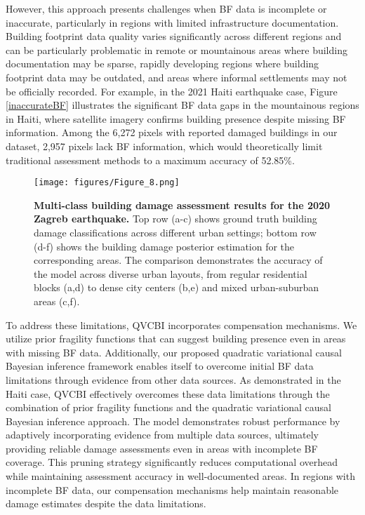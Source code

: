 \documentclass[review]{elsarticle}
\begin{document}
However, this approach presents challenges when BF data is incomplete or inaccurate, particularly in regions with limited infrastructure documentation. Building footprint data quality varies significantly across different regions and can be particularly problematic in remote or mountainous areas where building documentation may be sparse, rapidly developing regions where building footprint data may be outdated, and areas where informal settlements may not be officially recorded. For example, in the 2021 Haiti earthquake case, Figure \ref{inaccurateBF} illustrates the significant BF data gaps in the mountainous regions in Haiti, where satellite imagery confirms building presence despite missing BF information. Among the 6,272 pixels with reported damaged buildings in our dataset, 2,957 pixels lack BF information, which would theoretically limit traditional assessment methods to a maximum accuracy of 52.85\%.

\begin{figure*}[t]
    \centering
    \texttt{[image: figures/Figure\_8.png]}
    \caption{\textbf{Multi-class building damage assessment results for the 2020 Zagreb earthquake.} Top row (a-c) shows ground truth building damage classifications across different urban settings; bottom row (d-f) shows the building damage posterior estimation for the corresponding areas. The comparison demonstrates the accuracy of the model across diverse urban layouts, from regular residential blocks (a,d) to dense city centers (b,e) and mixed urban-suburban areas (c,f).}
    \label{Zagreb_vis}
\end{figure*}


To address these limitations, QVCBI incorporates compensation mechanisms. We utilize prior fragility functions that can suggest building presence even in areas with missing BF data. Additionally, our proposed quadratic variational causal Bayesian inference framework enables itself to overcome initial BF data limitations through evidence from other data sources. As demonstrated in the Haiti case, QVCBI effectively overcomes these data limitations through the combination of prior fragility functions and the quadratic variational causal Bayesian inference approach. The model demonstrates robust performance by adaptively incorporating evidence from multiple data sources, ultimately providing reliable damage assessments even in areas with incomplete BF coverage. This pruning strategy significantly reduces computational overhead while maintaining assessment accuracy in well-documented areas. In regions with incomplete BF data, our compensation mechanisms help maintain reasonable damage estimates despite the data limitations.
\end{document}
